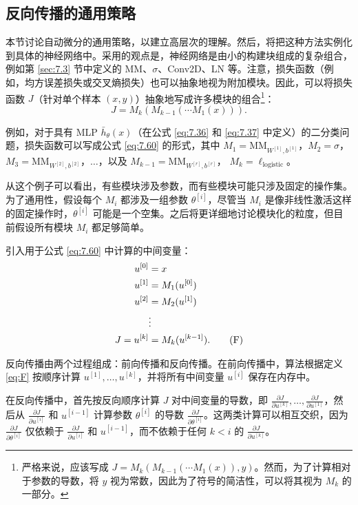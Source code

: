 \subsection{反向传播的通用策略}\label{sec:7.4.2}

本节讨论自动微分的通用策略，以建立高层次的理解。然后，将把这种方法实例化到具体的神经网络中。采用的观点是，神经网络是由小的构建块组成的复杂组合，例如第 \ref{sec:7.3} 节中定义的 MM、$\sigma$、Conv2D、LN 等。注意，损失函数（例如，均方误差损失或交叉熵损失）也可以抽象地视为附加模块。因此，可以将损失函数 $J$（针对单个样本 $(x, y)$）抽象地写成许多模块的组合\footnote{严格来说，应该写成 $J = M_k(M_{k-1}(\cdots M_1(x)), y)$。然而，为了计算相对于参数的导数，将 $y$ 视为常数，因此为了符号的简洁性，可以将其视为 $M_k$ 的一部分。}：
\begin{equation}
    J = M_k(M_{k-1}(\cdots M_1(x))). \label{eq:7.60}
\end{equation}

例如，对于具有 MLP $\bar{h}_\theta(x)$（在公式 \eqref{eq:7.36} 和 \eqref{eq:7.37} 中定义）的二分类问题，损失函数可以写成公式 \eqref{eq:7.60} 的形式，其中 $M_1 = \text{MM}_{W^{[1]}, b^{[1]}}$，$M_2 = \sigma$， $M_3 = \text{MM}_{W^{[2]}, b^{[2]}}$，$\dots$，以及 $M_{k-1} = \text{MM}_{W^{[r]}, b^{[r]}}$， $M_k = \ell_{\text{logistic}}$。

从这个例子可以看出，有些模块涉及参数，而有些模块可能只涉及固定的操作集。为了通用性，假设每个 $M_i$ 都涉及一组参数 $\theta^{[i]}$，尽管当 $M_i$ 是像非线性激活这样的固定操作时，$\theta^{[i]}$ 可能是一个空集。之后将更详细地讨论模块化的粒度，但目前假设所有模块 $M_i$ 都足够简单。

引入用于公式 \eqref{eq:7.60} 中计算的中间变量：
\begin{align}
    u^{[0]} &= x \notag\\
    u^{[1]} &= M_1(u^{[0]}) \notag\\
    u^{[2]} &= M_2(u^{[1]}) \notag\\
    &\vdots \notag\\
    J = u^{[k]} &= M_k(u^{[k-1]}). \tag{F}\label{eq:F}
\end{align}

反向传播由两个过程组成：前向传播和反向传播。在前向传播中，算法根据定义 \eqref{eq:F} 按顺序计算 $u^{[1]}, \dots, u^{[k]}$，并将所有中间变量 $u^{[i]}$ 保存在内存中。

在反向传播中，首先按反向顺序计算 $J$ 对中间变量的导数，即 $\frac{\partial J}{\partial u^{[k]}}, \dots, \frac{\partial J}{\partial u^{[1]}}$，然后从 $\frac{\partial J}{\partial u^{[i]}}$ 和 $u^{[i-1]}$ 计算参数 $\theta^{[i]}$ 的导数 $\frac{\partial J}{\partial \theta^{[i]}}$。这两类计算可以相互交织，因为 $\frac{\partial J}{\partial \theta^{[i]}}$ 仅依赖于 $\frac{\partial J}{\partial u^{[i]}}$ 和 $u^{[i-1]}$，而不依赖于任何 $k < i$ 的 $\frac{\partial J}{\partial u^{[k]}}$。

